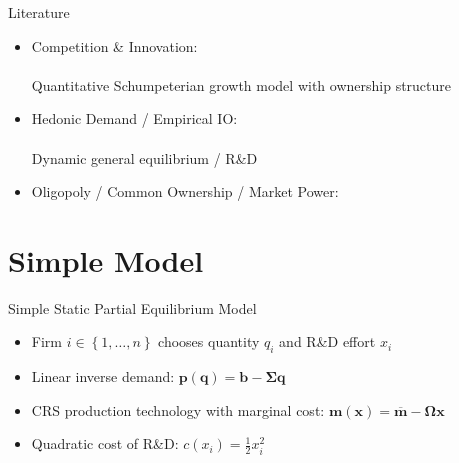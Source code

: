 \documentclass[
  10pt, %
  aspectratio=169,  %
  handout
]{beamer}
\theoremstyle{plain}
\begin{document}
\begin{frame}{Literature}
  \begin{itemize}
    \item Competition \& Innovation: \\
          {\footnotesize\citet{d-Aspremont1988-je,Aghion2001-yc,Aghion2005-vw,Acemoglu2012-bj,Aghion2013-nq,Bloom2013-pn,Lopez2019-sl,Peters2020-sd,Akcigit2021-ns,Akcigit2023-zl,Liu2022-iw,Cavenaile2023-lo,Anton2023-ej,Anton2024-pw,Kini2024-kd,Hopenhayn2024-ya}}\\
          \textcolor{uclaBlue}{Quantitative Schumpeterian growth model with ownership structure}\\
    \item Hedonic Demand / Empirical IO: \\
          {\footnotesize\citet{Lancaster1966-sg,Rosen1974-ep,Berry1995-lx,Nevo2001-ja,Pellegrino2024-dn,Ederer2024-rw}}\\
          \textcolor{uclaBlue}{Dynamic general equilibrium / R\&D}
    \item Oligopoly / Common Ownership / Market Power: \\
          {\footnotesize\citet{Rubinstein1983-pi,Rotemberg1984-jz,Neary2003-sn,Atkeson2008-zc,Gutierrez2017-wl,He2017-ix,Azar2018-cc,Azar2022-cn,Autor2020-mr,Baqaee2020-eb,De_Loecker2020-jn,Azar2021-uh,Edmond2023-bg}}
  \end{itemize}
\end{frame}

\section{Simple Model}

\begin{frame}{Simple Static Partial Equilibrium Model}
  \begin{itemize}
    \item Firm $i\in \left\{1,\ldots, n\right\}$ chooses quantity $q_i$ and R\&D effort $x_i$
          \medskip{}
    \item Linear inverse demand: $\boldsymbol{p}(\boldsymbol{q}) = \boldsymbol{b} - \boldsymbol{\Sigma} \boldsymbol{q}$\medskip{}
    \item CRS production technology with marginal cost: $\boldsymbol{m}(\boldsymbol{x}) = \overline{\boldsymbol{m}} - \boldsymbol{\Omega} \boldsymbol{x}$\medskip{}
    \item Quadratic cost of R\&D: $c(x_i) = \frac{1}{2}x_i^2$
  \end{itemize}
\end{frame}
\end{document}
